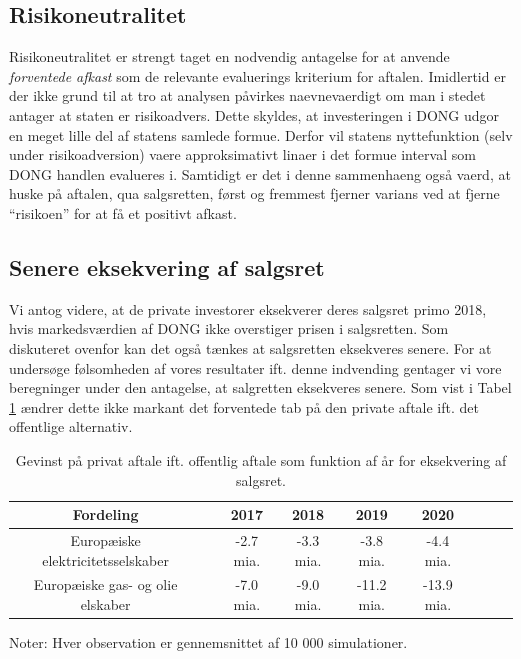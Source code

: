 \documentclass{article}
\begin{document}
\subsection{Risikoneutralitet}

Risikoneutralitet er strengt taget en nodvendig antagelse for at anvende \emph{forventede afkast} som de relevante evaluerings kriterium for aftalen. Imidlertid er der ikke grund til at tro at analysen påvirkes naevnevaerdigt om man i stedet antager at staten er risikoadvers. Dette skyldes, at investeringen i DONG udgor en meget lille del af statens samlede formue. Derfor vil statens nyttefunktion (selv under risikoadversion) vaere approksimativt linaer i det formue interval som DONG handlen evalueres i. Samtidigt er det i denne sammenhaeng også vaerd, at huske på aftalen, qua salgsretten, først og fremmest fjerner varians ved at fjerne \enquote{risikoen} for at få et positivt afkast. 

\subsection{Senere eksekvering af salgsret}

Vi antog videre, at de private investorer eksekverer deres salgsret primo 2018, hvis markedsværdien af DONG ikke overstiger prisen i salgsretten. Som diskuteret ovenfor kan det også tænkes at salgsretten eksekveres senere. For at undersøge følsomheden af vores resultater ift. denne indvending gentager vi vore beregninger under den antagelse, at salgretten eksekveres senere. Som vist i Tabel \ref{tab:robust_aar} ændrer dette ikke markant det forventede tab på den private aftale ift. det offentlige alternativ.

\begin{table}[h]
	\caption{Gevinst på privat aftale ift. offentlig aftale som funktion af \aa{}r for eksekvering af salgsret.}  
	\label{tab:robust_aar}
	\begin{tabularx}{\linewidth}{cXccccccr}
	\toprule[1pt]
	Fordeling && 2017 & 2018 & 2019 & 2020 \\
	\hline 
		Europ\ae{}iske elektricitetsselskaber && -2.7 mia. & -3.3 mia. & -3.8 mia. & -4.4 mia. \\
	Europ\ae{}iske gas- og olie elskaber && -7.0 mia. & -9.0 mia. & -11.2 mia.  &  -13.9 mia.  \\
		\bottomrule[1pt]
	\end{tabularx}
	\begin{minipage}{\linewidth}
		\footnotesize{Noter: Hver observation er gennemsnittet af 10 000 simulationer.}
	\end{minipage}
\end{table}




\FloatBarrier



\newpage



\end{document}
